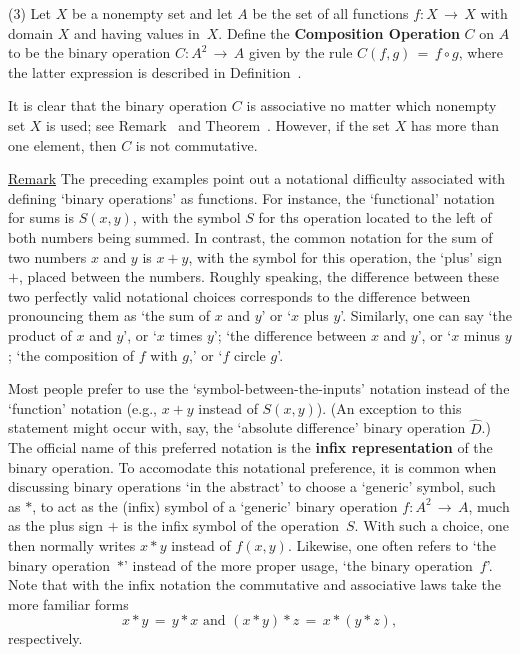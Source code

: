 {\V

       (3) Let $X$ be a nonempty set and let $A$ be the set of all functions $f:X \,{\rightarrow}\, X$ with domain $X$ and having values in~$X$.
    Define the {\bf Composition Operation} $C$ on $A$ to be the binary operation $C:A^{2} \,{\rightarrow}\, A$ given by the rule $C(f,g) \,=\, f{\circ}g$, where the latter expression is described in Definition~.

       It is clear that the binary operation $C$ is associative no matter which nonempty set $X$ is used;
    see Remark~ and Theorem~.
    However, if the set $X$ has more than one element, then $C$ is not commutative.

\V

        \underline{Remark} The preceding examples point out a notational difficulty associated with defining `binary operations' as functions.
    For instance, the `functional' notation for sums is $S(x,y)$, with the symbol $S$ for ths operation located to the left of both numbers being summed.
    In contrast, the common notation for the sum of two numbers $x$ and $y$ is $x+y$,
    with the symbol for this operation, the `plus' sign $+$, placed between the numbers.
    Roughly speaking, the difference between these two perfectly valid notational choices corresponds to the difference between pronouncing them
    as `the sum of $x$ and $y$' or `$x$ plus $y$'.
    Similarly, one can say `the product of $x$ and $y$', or `$x$ times $y$'; `the difference between $x$ and $y$', or `$x$ minus $y$;
    `the composition of $f$ with $g$,' or `$f$ circle $g$'.

        Most people prefer to use the `symbol-between-the-inputs' notation instead of the `function' notation (e.g., $x+y$ instead of $S(x,y)$).
    (An exception to this statement might occur with, say, the `absolute difference' binary operation $\hat{D}$.)
    The official name of this preferred notation is the
    {\bf infix representation} of the binary operation.
    To accomodate this notational preference, it is common when discussing binary operations `in the abstract' to choose a `generic' symbol,
    such as ${\ast}$, to act as the (infix) symbol of a `generic' binary operation $f:A^{2} \,{\rightarrow}\, A$,
    much as the plus sign $+$ is the infix symbol of the operation~$S$.
    With such a choice, one then normally writes $x{\ast}y$ instead of $f(x,y)$. 
    Likewise, one often refers to `the binary operation~${\ast}$' instead of the more proper usage, `the binary operation~$f$'.
    Note that with the infix notation the commutative and associative laws take the more familiar forms
        \begin{displaymath}
        x{\ast}y \,=\, y{\ast}x \mbox{ and } (x{\ast}y){\ast}z \,=\, x{\ast}(y{\ast}z),
        \end{displaymath}
    respectively.

}
